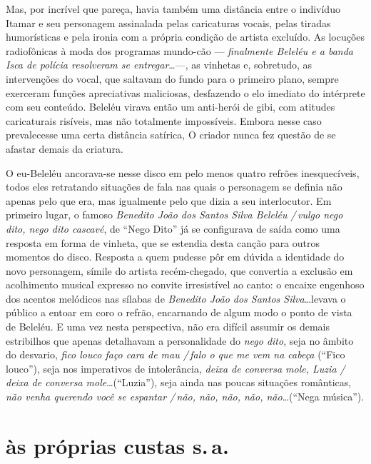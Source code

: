 Mas, por incrível que pareça, havia também uma distância entre o
indivíduo Itamar e seu personagem assinalada pelas caricaturas vocais,
pelas tiradas humorísticas e pela ironia com a própria condição de
artista excluído. As locuções radiofônicas à moda dos programas
mundo-cão --- \textit{finalmente Beleléu e a banda Isca de polícia resolveram se
entregar}\ldots ---, as vinhetas e, sobretudo, as intervenções do vocal, que
saltavam do fundo para o primeiro plano, sempre exerceram funções
apreciativas maliciosas, desfazendo o elo imediato do intérprete com seu
conteúdo. Beleléu virava então um anti-herói de gibi, com atitudes
caricaturais risíveis, mas não totalmente impossíveis. Embora nesse caso
prevalecesse uma certa distância satírica, O criador nunca fez questão
de se afastar demais da criatura.

O eu-Beleléu ancorava-se nesse disco em pelo menos quatro refrões
inesquecíveis, todos eles retratando situações de fala nas quais o
personagem se definia não apenas pelo que era, mas igualmente pelo que
dizia a seu interlocutor. Em primeiro lugar, o famoso \textit{Benedito João
dos Santos Silva Beleléu /\,vulgo nego dito, nego dito cascavé}, de ``Nego
Dito'' já se configurava de saída \textbar{} como uma resposta em forma de
vinheta, que se estendia desta canção para outros momentos do disco.
Resposta a quem pudesse pôr em dúvida a identidade do novo personagem,
símile do artista recém-chegado, que convertia a exclusão em acolhimento
musical expresso no convite irresistível ao canto: o encaixe engenhoso
dos acentos melódicos nas sílabas de \textit{Benedito João dos Santos
Silva}\ldots levava o público a entoar em coro o refrão, encarnando de
algum modo o ponto de vista de Beleléu. E uma vez nesta perspectiva, não
era difícil assumir os demais estribilhos que apenas detalhavam a
personalidade do \textit{nego dito}, seja no âmbito do desvario, \textit{fico louco
faço cara de mau /\,falo o que me vem na cabeça} (``Fico louco''), seja nos
imperativos de intolerância, \textbar{} \textit{deixa de conversa mole, Luzia
/\,deixa de conversa mole}\ldots (``Luzia''), seja ainda nas poucas situações
românticas, \textit{não venha querendo você se espantar /\,não, não, não, não,
não}\ldots (``Nega música'').

\section{às próprias custas s.\,a.}


